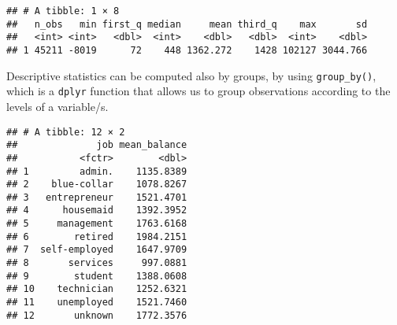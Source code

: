 \documentclass[]{book}
\newenvironment{Shaded}{\begin{snugshade}}{\end{snugshade}}
\newcommand{\KeywordTok}[1]{\textcolor[rgb]{0.13,0.29,0.53}{\textbf{{#1}}}}
\newcommand{\DataTypeTok}[1]{\textcolor[rgb]{0.13,0.29,0.53}{{#1}}}
\newcommand{\StringTok}[1]{\textcolor[rgb]{0.31,0.60,0.02}{{#1}}}
\newcommand{\CommentTok}[1]{\textcolor[rgb]{0.56,0.35,0.01}{\textit{{#1}}}}
\newcommand{\OtherTok}[1]{\textcolor[rgb]{0.56,0.35,0.01}{{#1}}}
\newcommand{\NormalTok}[1]{{#1}}
\begin{document}
\begin{verbatim}
## # A tibble: 1 × 8
##   n_obs   min first_q median     mean third_q    max       sd
##   <int> <int>   <dbl>  <int>    <dbl>   <dbl>  <int>    <dbl>
## 1 45211 -8019      72    448 1362.272    1428 102127 3044.766
\end{verbatim}

Descriptive statistics can be computed also by groups, by using
\texttt{group\_by()}, which is a \texttt{dplyr} function that allows us
to group observations according to the levels of a variable/s.

\begin{Shaded}
\end{Shaded}

\begin{verbatim}
## # A tibble: 12 × 2
##              job mean_balance
##           <fctr>        <dbl>
## 1         admin.    1135.8389
## 2    blue-collar    1078.8267
## 3   entrepreneur    1521.4701
## 4      housemaid    1392.3952
## 5     management    1763.6168
## 6        retired    1984.2151
## 7  self-employed    1647.9709
## 8       services     997.0881
## 9        student    1388.0608
## 10    technician    1252.6321
## 11    unemployed    1521.7460
## 12       unknown    1772.3576
\end{verbatim}
\end{document}
